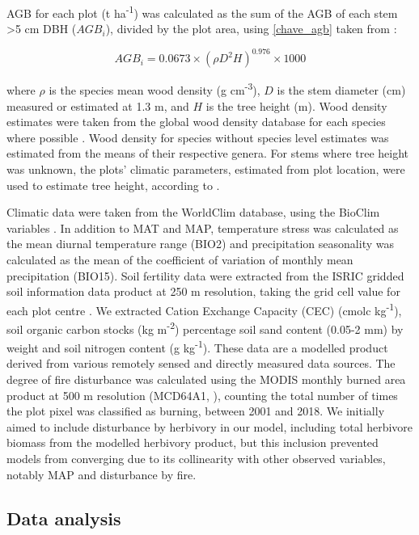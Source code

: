 \documentclass[12pt,a4paper]{article}
\begin{document}
AGB for each plot (t ha\textsuperscript{-1}) was calculated as the sum of the AGB of each stem >5 cm DBH ($AGB_{i}$), divided by the plot area, using \autoref{chave_agb} taken from \citet{Chave2014}:

\begin{equation}
	AGB_{i} = 0.0673 \times (\rho D^{2} H)^{0.976} \times 1000
	\label{chave_agb}
\end{equation}

where $\rho$ is the species mean wood density (g cm\textsuperscript{-3}), $D$ is the stem diameter (cm) measured or estimated at 1.3 m, and $H$ is the tree height (m). Wood density estimates were taken from the global wood density database for each species where possible \citep{Chave2009, Zanne2009}. Wood density for species without species level estimates was estimated from the means of their respective genera. For stems where tree height was unknown, the plots' climatic parameters, estimated from plot location, were used to estimate tree height, according to \citet{Chave2014}.

Climatic data were taken from the WorldClim database, using the BioClim variables \citep{Fick2017}. In addition to MAT and MAP, temperature stress was calculated as the mean diurnal temperature range (BIO2) and precipitation seasonality was calculated as the mean of the coefficient of variation of monthly mean precipitation (BIO15). Soil fertility data were extracted from the ISRIC gridded soil information data product at 250 m resolution, taking the grid cell value for each plot centre \citep{Hengl2017}. We extracted Cation Exchange Capacity (CEC) (cmolc kg\textsuperscript{-1}), soil organic carbon stocks (kg m\textsuperscript{-2}) percentage soil sand content (0.05-2 mm) by weight and soil nitrogen content (g kg\textsuperscript{-1}). These data are a modelled product derived from various remotely sensed and directly measured data sources. The degree of fire disturbance was calculated using the MODIS monthly burned area product at 500 m resolution (MCD64A1, \citealt{MODIS_burn}), counting the total number of times the plot pixel was classified as burning, between 2001 and 2018. We initially aimed to include disturbance by herbivory in our model, including total herbivore biomass from the \citet{Hempson2017} modelled herbivory product, but this inclusion prevented models from converging due to its collinearity with other observed variables, notably MAP and disturbance by fire. 

\subsection{Data analysis}
\end{document}
